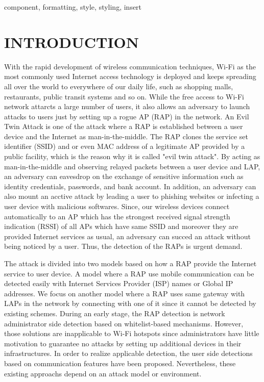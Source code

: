 \documentclass[conference]{IEEEtran}
\begin{document}
\begin{IEEEkeywords}
component, formatting, style, styling, insert
\end{IEEEkeywords}

\section{INTRODUCTION}
With the rapid development of wireless communication techniques, Wi-Fi as the most commonly used Internet access technology is deployed and keeps spreading all over the world to everywhere of our daily life, such as shopping malls, restaurants, public transit systems and so on.
While the free access to Wi-Fi network attarcts a large number of users, it also allows an adversary to launch attacks to users just by setting up a rogue AP (RAP) in the network.
An Evil Twin Attack is one of the attack where a RAP is established between a user device and the Internet as man-in-the-middle.
The RAP clones the service set identifier (SSID) and or even MAC address of a legitimate AP provided by a public facility, which is the reason why it is called "evil twin attack".
By acting as man-in-the-middle and observing relayed packets between a user device and LAP, an adversary can eavesdrop on the exchange of sensitive information such as identity credentials, passwords, and bank account.
In addition, an adversary can also mount an acctive attack by leading a user to phishing websites or infecting a user device with malicious softwares.
Since, our wireless devices connect automatically to an AP which has the strongest received signal strength indication (RSSI) of all APs which have same SSID and moreover they are provided Internet services as usual, an adversary can succed an attack without being noticed by a user.
Thus, the detection of the RAPs is urgent demand.

The attack is divided into two models based on how a RAP provide the Internet service to user device.
A model where a RAP use mobile communication can be detected easily with Internet Services Provider (ISP) names or Global IP addresses\cite{rtt}.
We focus on another model where a RAP uses same gateway with LAPs in the network by connecting with one of it since it cannot be detected by existing schemes.
During an early stage, the RAP detection is network administrator side detection based on whitelist-based mechanisms\cite{prapd}\cite{clockskew }.
However, those solutions are inapplicable to Wi-Fi hotspots since administrators have little motivation to guarantee no attacks by setting up additional devices in their infrastructures.
In order to realize applicable detection, the user side detections based on communication features have been proposed\cite{rtt}\cite{previous}.
Nevertheless, these existing approachs depend on an attack model or environment.
\end{document}
